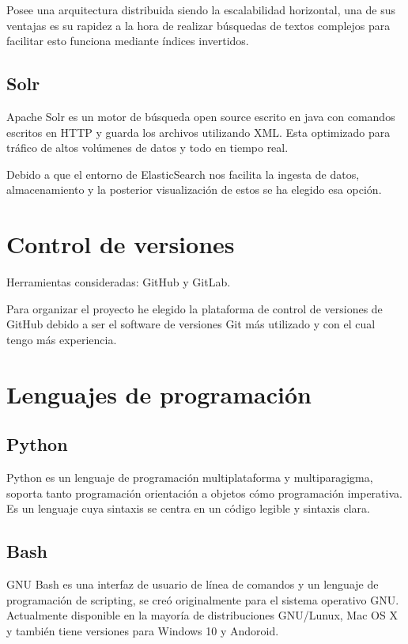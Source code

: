 Posee una arquitectura distribuida siendo la escalabilidad horizontal, una de sus ventajas es su rapidez a la hora de realizar búsquedas de textos complejos para facilitar esto funciona mediante índices invertidos.\cite{pagina:ElasticSearch}  

\subsection{Solr}
Apache Solr es un motor de búsqueda open source escrito en java con comandos escritos en HTTP y guarda los archivos utilizando XML. Esta optimizado para tráfico de altos volúmenes de datos y todo en tiempo real.\cite{pagina:Solr} 

Debido a que el entorno de ElasticSearch nos facilita la ingesta de datos, almacenamiento y la posterior visualización de estos se ha elegido esa opción.

\section{Control de versiones}

Herramientas consideradas: GitHub y GitLab.

Para organizar el proyecto he elegido la plataforma de control de versiones de GitHub debido a ser el software de versiones Git más utilizado y con el cual tengo más experiencia.

\section{Lenguajes de programación}

\subsection{Python}
Python es un lenguaje de programación multiplataforma y multiparagigma, soporta tanto programación orientación a objetos cómo programación imperativa. Es un lenguaje cuya sintaxis se centra en un código legible y sintaxis clara. \cite{pagina:Python_documentation}

\subsection{Bash}
GNU Bash es una interfaz de usuario de línea de comandos y un lenguaje de programación de scripting, se creó originalmente para el sistema operativo GNU. Actualmente disponible en la mayoría de distribuciones GNU/Lunux, Mac OS X y también tiene versiones para Windows 10 y Andoroid.

